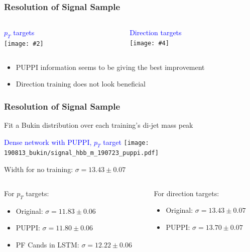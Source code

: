 \documentclass{beamer}
\newcommand{\twofigs}[4]{
  \begin{columns}
    \begin{column}{0.5\linewidth}
      \centering
      \textcolor{blue}{#1} \\
      \texttt{[image: \#2]}
    \end{column}
    \begin{column}{0.5\linewidth}
      \centering
      \textcolor{blue}{#3} \\
      \texttt{[image: \#4]}
    \end{column}
  \end{columns}
}
\begin{document}
\begin{frame}
  \frametitle{Resolution of Signal Sample}

  \twofigs{$p_T$ targets}
          {190813_compare/comparison.pdf}
          {Direction targets}
          {190813_compare_direction/comparison.pdf}

  \begin{itemize}
  \item PUPPI information seems to be giving the best improvement
  \item Direction training does not look beneficial
  \end{itemize}


\end{frame}

\begin{frame}
  \frametitle{Resolution of Signal Sample}

  Fit a Bukin distribution over each training's di-jet mass peak

  \begin{center}
    \textcolor{blue}{Dense network with PUPPI, $p_T$ target}
    \texttt{[image: 190813\_bukin/signal\_hbb\_m\_190723\_puppi.pdf]}
  \end{center}

  Width for no training: $\sigma = 13.43 \pm 0.07$

  \vspace{12pt}

  \begin{columns}
    \begin{column}{0.5\linewidth}
      For $p_T$ targets:
      \begin{itemize}
      \item Original: $\sigma = 11.83 \pm 0.06$
      \item PUPPI: $\sigma = 11.80 \pm 0.06$
      \item PF Cands in LSTM: $\sigma = 12.22 \pm 0.06$
      \end{itemize}
    \end{column}
    \begin{column}{0.5\linewidth}
      For direction targets:
      \begin{itemize}
      \item Original: $\sigma = 13.43 \pm 0.07$
      \item PUPPI: $\sigma = 13.70 \pm 0.07$
        \phantom{\item PF Cands in LSTM: \\ $\sigma = 12.22$}
        \phantom{\item PF Cands in LSTM: \\ $\sigma = 12.22$}
      \end{itemize}
    \end{column}
  \end{columns}


\end{frame}
\end{document}
